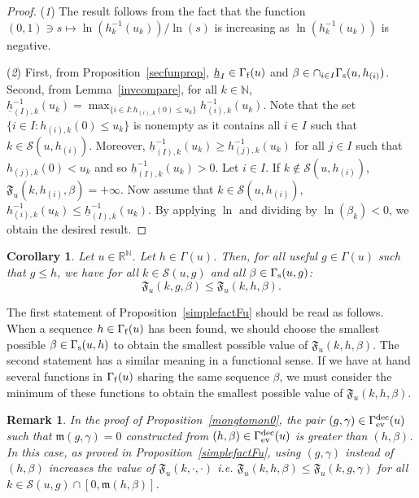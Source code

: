 \documentclass{article}
\def\funset{\Gamma}
\def\fmong{\funset_{{\rm ev}}^{\rm dec}}
\def\mon{\mathfrak{m}}
\def\secfunh{\funset_{\rm f}}
\def\secfunb{\funset_{\rm s}}
\def\Fu{\mathfrak{F}_u}
\def\rr{\mathbb R}
\def\nn{\mathbb N}
\def\res{\mathcal{S}}
\newtheorem{coro}{Corollary}
\newtheorem{remark}{Remark}
\def\red#1{#1}
\def\blue#1{#1}
\begin{document}
	\begin{proof}
		({\itshape 1}) The result follows from the fact that the function $(0,1)\ni s\mapsto \ln(h_k^{-1}(u_k))/\ln(s)$ is increasing as $\ln(h_k^{-1}(u_k))$ is negative.
		
		({\itshape 2}) First, from Proposition~\ref{secfunprop}, $\underline{h}_I\in \secfunh(u)$ and $\beta\in\cap_{i\in I} \secfunb(u,h_{(i)})$. Second, from Lemma~\ref{invcompare}, for all $k\in\nn$, \blue{${\underline{h}}_{(I),k}^{-1}(u_k)=\max_{\{i\in I: h_{(i),k}(0)\leq u_k\}} h_{(i),k}^{-1}(u_k)$}. Note that \blue{the set $\{i\in I: h_{(i),k}(0)\leq u_k\}$} is nonempty as it contains all $i\in I$ such that $k\in\res\left(u,h_{(i)}\right)$. Moreover, ${\underline{h}}_{(I),k}^{-1}(u_k)\geq h_{(j),k}^{-1}(u_k)$ for all $j\in I$ such that $h_{(j),k}(0)<u_k$ and so ${\underline{h}}_{(I),k}^{-1}(u_k)>0$. Let $i\in I$. If $k\notin \res(u,h_{(i)})$, $\Fu(k,h_{(i)},\beta)=+\infty$. Now assume that $k\in \res(u,h_{(i)})$, $h_{(i),k}^{-1}(u_k)\leq {\underline{h}}_{(I),k}^{-1}(u_k)$. By applying $\ln$ and dividing by $\ln(\beta_k)<0$, we obtain the desired result.
	\end{proof}
	
	\begin{coro}
		\label{coroinc}
		Let $u\in\rr^\nn$. Let $h\in\funset(u)$. Then, for all useful $g\in\funset(u)$ such that $g \leq h$, we have for all $k\in\res(u,g)$ and all $\beta\in\secfunb(u,g)$:
		\[
		\Fu(k,g,\beta)\leq \Fu(k,h,\beta).
		\]
	\end{coro}
	
	The first statement of Proposition~\ref{simplefactFu} \red{should} be read as follows. \red{When} a sequence $h\in\secfunh(u)$ has been found, we \red{should} choose the smallest possible $\beta\in\secfunb(u,h)$ to obtain the smallest possible value of $\Fu(k,h,\beta)$. The second statement has a similar meaning in a functional sense. If we have at hand several functions in $\secfunh(u)$ sharing \red{the} same sequence $\beta$, we \red{must} consider the minimum of these functions to obtain the smallest possible value of $\Fu(k,h,\beta)$.
	\begin{remark}
		In the proof of Proposition~\ref{mongtomon0}, the pair \blue{$(g,\gamma)\in\fmong(u)$ such that $\mon(g,\gamma)=0$ constructed from $(h,\beta)\in\fmong(u)$ is greater than $(h,\beta)$}. In this case, as proved in Proposition~\ref{simplefactFu}, \red{using} \blue{$(g,\gamma)$ instead of $(h,\beta)$} \red{increases} the value of $\Fu(k,\cdot,\cdot)$ i.e. \blue{$\Fu(k,h,\beta)\leq \Fu(k,g,\gamma)$} for all $k\in\res(u,g)\cap [0,\blue{\mon(h,\beta)}]$.
	\end{remark}
\end{document}
